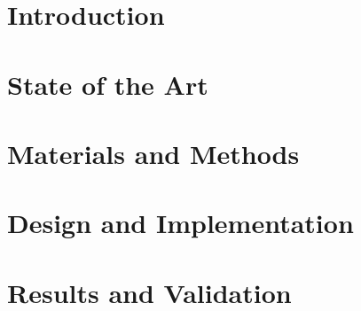 \documentclass[a4paper,oneside,12pt]{book}
\begin{document}




\tableofcontents
\listoffigures
\listoftables
\pagebreak

\chapter{Introduction}
\chapter{State of the Art}


\chapter{Materials and Methods}
  

%  


\chapter{Design and Implementation}


\chapter{Results and Validation}



\begin{footnotesize}
\cleardoublepage
{}


\end{footnotesize}
\end{document}
